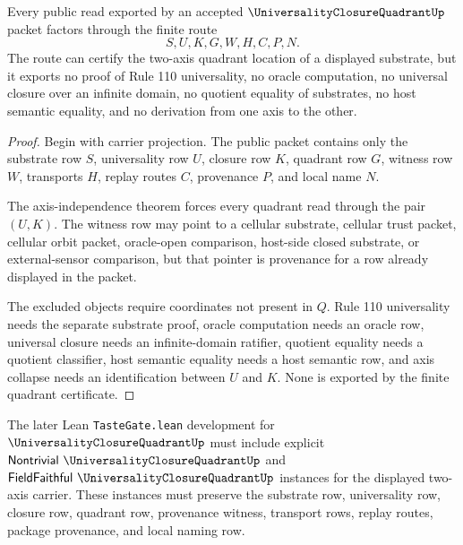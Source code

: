 \begin{theorem}
\label{thm:universality-closure-quadrant-nonescape}
Every public read exported by an accepted $\UniversalityClosureQuadrantUp$ packet factors through the finite route
$$
S,U,K,G,W,H,C,P,N .
$$
The route can certify the two-axis quadrant location of a displayed substrate, but it exports no proof of Rule 110 universality, no oracle computation, no universal closure over an infinite domain, no quotient equality of substrates, no host semantic equality, and no derivation from one axis to the other.
\end{theorem}
\begin{proof}
Begin with carrier projection. The public packet contains only the substrate row $S$, universality row $U$, closure row $K$, quadrant row $G$, witness row $W$, transports $H$, replay routes $C$, provenance $P$, and local name $N$.

The axis-independence theorem forces every quadrant read through the pair $(U,K)$. The witness row may point to a cellular substrate, cellular trust packet, cellular orbit packet, oracle-open comparison, host-side closed substrate, or external-sensor comparison, but that pointer is provenance for a row already displayed in the packet.

The excluded objects require coordinates not present in $Q$. Rule 110 universality needs the separate substrate proof, oracle computation needs an oracle row, universal closure needs an infinite-domain ratifier, quotient equality needs a quotient classifier, host semantic equality needs a host semantic row, and axis collapse needs an identification between $U$ and $K$. None is exported by the finite quadrant certificate.
\end{proof}

The later Lean \texttt{TasteGate.lean} development for $\UniversalityClosureQuadrantUp$ must include explicit $\mathsf{Nontrivial}\ \UniversalityClosureQuadrantUp$ and $\mathsf{FieldFaithful}\ \UniversalityClosureQuadrantUp$ instances for the displayed two-axis carrier. These instances must preserve the substrate row, universality row, closure row, quadrant row, provenance witness, transport rows, replay routes, package provenance, and local naming row.


